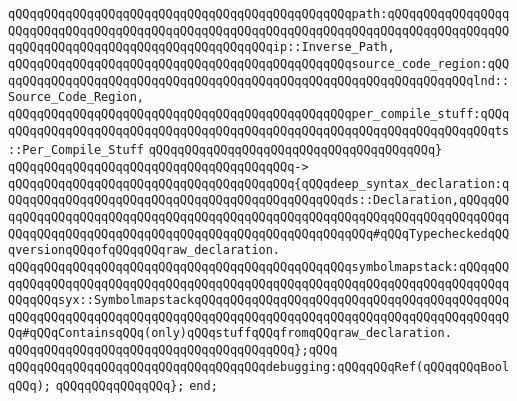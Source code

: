 \newline
\verb|qQQqqQQqqQQqqQQqqQQqqQQqqQQqqQQqqQQqqQQqqQQqqQQqpath:qQQqqQQqqQQqqQQqqQQqqQQqqQQqqQQqqQQqqQQqqQQqqQQqqQQqqQQqqQQqqQQqqQQqqQQqqQQqqQQqqQQqqQQqqQQqqQQqqQQqqQQqqQQqqQQqqQQqqQQqqQQqip::Inverse_Path,|\newline
\verb|qQQqqQQqqQQqqQQqqQQqqQQqqQQqqQQqqQQqqQQqqQQqqQQqsource_code_region:qQQqqQQqqQQqqQQqqQQqqQQqqQQqqQQqqQQqqQQqqQQqqQQqqQQqqQQqqQQqqQQqqQQqlnd::Source_Code_Region,|\newline
\verb|qQQqqQQqqQQqqQQqqQQqqQQqqQQqqQQqqQQqqQQqqQQqqQQqper_compile_stuff:qQQqqQQqqQQqqQQqqQQqqQQqqQQqqQQqqQQqqQQqqQQqqQQqqQQqqQQqqQQqqQQqqQQqqQQqts::Per_Compile_Stuff|\newline
\verb|qQQqqQQqqQQqqQQqqQQqqQQqqQQqqQQqqQQqqQQq}|\newline
\verb|qQQqqQQqqQQqqQQqqQQqqQQqqQQqqQQqqQQqqQQq->|\newline
\verb|qQQqqQQqqQQqqQQqqQQqqQQqqQQqqQQqqQQqqQQq{qQQqdeep_syntax_declaration:qQQqqQQqqQQqqQQqqQQqqQQqqQQqqQQqqQQqqQQqqQQqqQQqds::Declaration,qQQqqQQqqQQqqQQqqQQqqQQqqQQqqQQqqQQqqQQqqQQqqQQqqQQqqQQqqQQqqQQqqQQqqQQqqQQqqQQqqQQqqQQqqQQqqQQqqQQqqQQqqQQqqQQqqQQqqQQqqQQqqQQq#qQQqTypecheckedqQQqversionqQQqofqQQqqQQqraw_declaration.|\newline
\verb|qQQqqQQqqQQqqQQqqQQqqQQqqQQqqQQqqQQqqQQqqQQqqQQqsymbolmapstack:qQQqqQQqqQQqqQQqqQQqqQQqqQQqqQQqqQQqqQQqqQQqqQQqqQQqqQQqqQQqqQQqqQQqqQQqqQQqqQQqqQQqsyx::SymbolmapstackqQQqqQQqqQQqqQQqqQQqqQQqqQQqqQQqqQQqqQQqqQQqqQQqqQQqqQQqqQQqqQQqqQQqqQQqqQQqqQQqqQQqqQQqqQQqqQQqqQQqqQQqqQQqqQQqqQQq#qQQqContainsqQQq(only)qQQqstuffqQQqfromqQQqraw_declaration.|\newline
\verb|qQQqqQQqqQQqqQQqqQQqqQQqqQQqqQQqqQQqqQQq};qQQq|\newline
\newline
\verb|qQQqqQQqqQQqqQQqqQQqqQQqqQQqqQQqqQQqdebugging:qQQqqQQqRef(qQQqqQQqBoolqQQq);|\newline
\verb|qQQqqQQqqQQqqQQq};|\newline
\verb|end;|\newline
\newline
\newline
\newline
\newline
\newline
\newline
\newline
\newline
\newline

